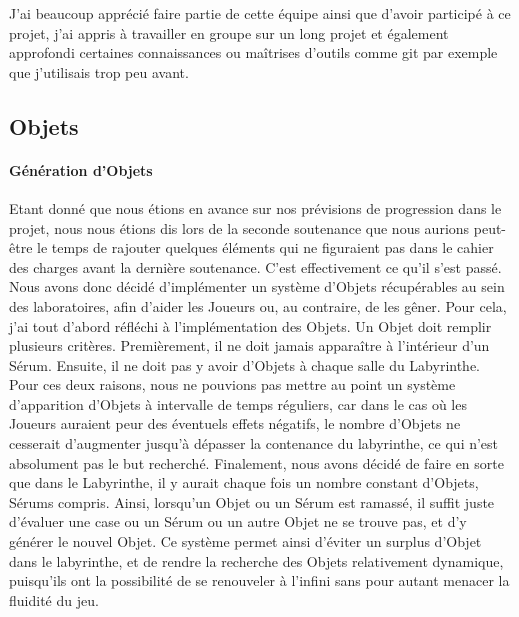 \documentclass{article}
\begin{document}
J'ai beaucoup apprécié faire partie de cette équipe ainsi que d'avoir participé à ce projet, j'ai appris à travailler en groupe sur un long projet et également approfondi certaines connaissances ou maîtrises d'outils comme git par exemple que j'utilisais trop peu avant.



\newpage
\subsection{Objets}
\paragraph{Génération d'Objets}
Etant donné que nous étions en avance sur nos prévisions de progression dans le projet, nous nous étions dis lors de la seconde soutenance que nous aurions peut-être le temps de rajouter quelques éléments qui ne figuraient pas dans le cahier des charges avant la dernière soutenance. C'est effectivement ce qu'il s'est passé. Nous avons donc décidé d'implémenter un système d'Objets récupérables au sein des laboratoires, afin d'aider les Joueurs ou, au contraire, de les gêner. Pour cela, j'ai tout d'abord réfléchi à l'implémentation des Objets. Un Objet doit remplir plusieurs critères. Premièrement, il ne doit jamais apparaître à l'intérieur d'un Sérum. Ensuite, il ne doit pas y avoir d'Objets à chaque salle du Labyrinthe. Pour ces deux raisons, nous ne pouvions pas mettre au point un système d'apparition d'Objets à intervalle de temps réguliers, car dans le cas où les Joueurs auraient peur des éventuels effets négatifs, le nombre d'Objets ne cesserait d'augmenter jusqu'à dépasser la contenance du labyrinthe, ce qui n'est absolument pas le but recherché. Finalement, nous avons décidé de faire en sorte que dans le Labyrinthe, il y aurait chaque fois un nombre constant d'Objets, Sérums compris. Ainsi, lorsqu'un Objet ou un Sérum est ramassé, il suffit juste d'évaluer une case ou un Sérum ou un autre Objet ne se trouve pas, et d'y générer le nouvel Objet. Ce système permet ainsi d'éviter un surplus d'Objet dans le labyrinthe, et de rendre la recherche des Objets relativement dynamique, puisqu'ils ont la possibilité de se renouveler à l'infini sans pour autant menacer la fluidité du jeu. 
\end{document}
